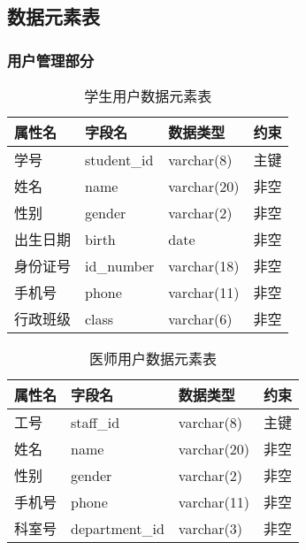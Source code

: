 \documentclass{article}
\begin{document}
\subsection{数据元素表}
\subsubsection{用户管理部分}

\begin{table}[H]
    \centering
    \begin{tabularx}{\textwidth}{|>{\raggedright\arraybackslash}X|>{\raggedright\arraybackslash}X|>{\raggedright\arraybackslash}X|>{\raggedright\arraybackslash}X|}
    \toprule
    \textbf{属性名} & \textbf{字段名} & \textbf{数据类型} & \textbf{约束} \\ \midrule
    学号 & student\_id & varchar(8) & 主键 \\ \midrule
    姓名 & name & varchar(20) & 非空 \\ \midrule
    性别 & gender & varchar(2) & 非空 \\ \midrule
    出生日期 & birth & date & 非空 \\ \midrule
    身份证号 & id\_number & varchar(18) & 非空 \\ \midrule
    手机号 & phone & varchar(11) & 非空 \\ \midrule
    行政班级 & class & varchar(6) & 非空 \\ \bottomrule
    \end{tabularx}
    \caption{学生用户数据元素表}
    \label{tab:student_user_elements}
\end{table}

\begin{table}[H]
    \centering
    \begin{tabularx}{\textwidth}{|>{\raggedright\arraybackslash}X|>{\raggedright\arraybackslash}X|>{\raggedright\arraybackslash}X|>{\raggedright\arraybackslash}X|}
    \toprule
    \textbf{属性名} & \textbf{字段名} & \textbf{数据类型} & \textbf{约束} \\ \midrule
    工号 & staff\_id & varchar(8) & 主键 \\ \midrule
    姓名 & name & varchar(20) & 非空 \\ \midrule
    性别 & gender & varchar(2) & 非空 \\ \midrule
    手机号 & phone & varchar(11) & 非空 \\ \midrule
    科室号 & department\_id & varchar(3) & 非空 \\ \bottomrule
    \end{tabularx}
    \caption{医师用户数据元素表}
    \label{tab:doctor_user_elements}
\end{table}
\end{document}
